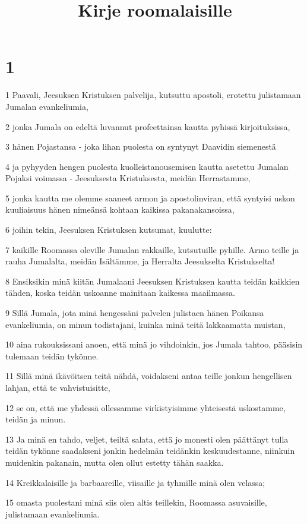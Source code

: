 

\title{Kirje roomalaisille}


\chapter{1}

\par 1 Paavali, Jeesuksen Kristuksen palvelija, kutsuttu apostoli, erotettu julistamaan Jumalan evankeliumia,
\par 2 jonka Jumala on edeltä luvannut profeettainsa kautta pyhissä kirjoituksissa,
\par 3 hänen Pojastansa - joka lihan puolesta on syntynyt Daavidin siemenestä
\par 4 ja pyhyyden hengen puolesta kuolleistanousemisen kautta asetettu Jumalan Pojaksi voimassa - Jeesuksesta Kristuksesta, meidän Herrastamme,
\par 5 jonka kautta me olemme saaneet armon ja apostolinviran, että syntyisi uskon kuuliaisuus hänen nimeänsä kohtaan kaikissa pakanakansoissa,
\par 6 joihin tekin, Jeesuksen Kristuksen kutsumat, kuulutte:
\par 7 kaikille Roomassa oleville Jumalan rakkaille, kutsutuille pyhille. Armo teille ja rauha Jumalalta, meidän Isältämme, ja Herralta Jeesukselta Kristukselta!
\par 8 Ensiksikin minä kiitän Jumalaani Jeesuksen Kristuksen kautta teidän kaikkien tähden, koska teidän uskoanne mainitaan kaikessa maailmassa.
\par 9 Sillä Jumala, jota minä hengessäni palvelen julistaen hänen Poikansa evankeliumia, on minun todistajani, kuinka minä teitä lakkaamatta muistan,
\par 10 aina rukouksissani anoen, että minä jo vihdoinkin, jos Jumala tahtoo, pääsisin tulemaan teidän tykönne.
\par 11 Sillä minä ikävöitsen teitä nähdä, voidakseni antaa teille jonkun hengellisen lahjan, että te vahvistuisitte,
\par 12 se on, että me yhdessä ollessamme virkistyisimme yhteisestä uskostamme, teidän ja minun.
\par 13 Ja minä en tahdo, veljet, teiltä salata, että jo monesti olen päättänyt tulla teidän tykönne saadakseni jonkin hedelmän teidänkin keskuudestanne, niinkuin muidenkin pakanain, mutta olen ollut estetty tähän saakka.
\par 14 Kreikkalaisille ja barbaareille, viisaille ja tyhmille minä olen velassa;
\par 15 omasta puolestani minä siis olen altis teillekin, Roomassa asuvaisille, julistamaan evankeliumia.
